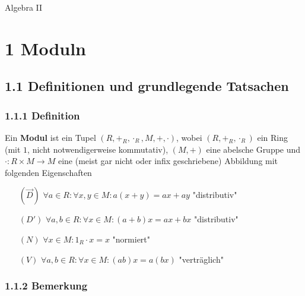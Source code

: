 \documentclass{book}
\begin{document}
	\begin{titlepage}
		\centering
		
		\vfill
		
		\Large Algebra II
		
		\vfill

	\end{titlepage}
	
	
	\chapter*{1 Moduln}
	
	
	\section*{1.1 Definitionen und grundlegende Tatsachen}
	
	\subsection*{1.1.1 Definition}
	Ein {\bf Modul} ist ein Tupel $(R, +_R, \cdot_R, M, +, \cdot)$, wobei $(R, +_R, \cdot_R)$ ein Ring (mit $1$, nicht notwendigerweise kommutativ), $(M, +)$ eine abelsche Gruppe und \\\noindent$\cdot:R\times M \to M$ eine (meist gar nicht oder infix geschriebene) Abbildung mit folgenden Eigenschaften
	
	\begin{itemize}
		\item[$(\overset{\rightarrow}{D})$] $\forall a \in R: \forall x, y \in M: a(x + y) = ax + ay$ \hfill "distributiv"
		
		\item[$(D')$] $\forall a, b \in R: \forall x \in M: (a+b)x = ax + bx$ \hfill "distributiv"
		
		\item[$(N)$] $\forall x \in M: 1_R \cdot x = x$ \hfill "normiert"
		
		\item[$(V)$] $\forall a, b \in R: \forall x \in M: (ab)x = a(bx)$ \hfill "vertr\"aglich"
	\end{itemize}
	
	
	\subsection*{1.1.2 Bemerkung}
	
\end{document}
